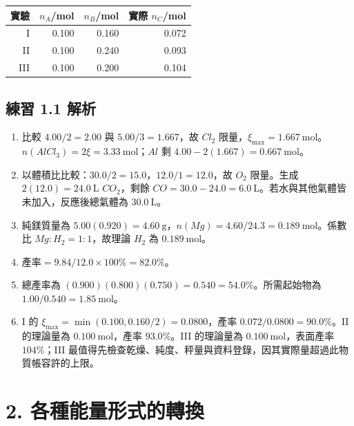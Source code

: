 \documentclass[11pt,a4paper]{article}
\newcounter{none}
\providecommand{\tightlist}{%
  \setlength{\itemsep}{0pt}\setlength{\parskip}{0pt}}
\begin{document}
{\def\LTcaptype{none} %
\begin{longtable}[]{@{}rrrr@{}}
\toprule\noalign{}
實驗 & \(n_A\)/mol & \(n_B\)/mol & 實際 \(n_C\)/mol \\
\midrule\noalign{}
\endhead
\bottomrule\noalign{}
\endlastfoot
I & 0.100 & 0.160 & 0.072 \\
II & 0.100 & 0.240 & 0.093 \\
III & 0.100 & 0.200 & 0.104 \\
\end{longtable}
}

\subsection{練習 1.1 解析}\label{ux7df4ux7fd2-1.1-ux89e3ux6790}

\begin{enumerate}
\def\labelenumi{\arabic{enumi}.}
\tightlist
\item
  比較 \(4.00/2=2.00\) 與 \(5.00/3=1.667\)，故 \(Cl_2\) 限量，\(\xi_{\max}=1.667\ \mathrm{mol}\)。\(n(AlCl_3)=2\xi=3.33\ \mathrm{mol}\)；\(Al\) 剩 \(4.00-2(1.667)=0.667\ \mathrm{mol}\)。
\item
  以體積比比較：\(30.0/2=15.0\)，\(12.0/1=12.0\)，故 \(O_2\) 限量。生成 \(2(12.0)=24.0\ \mathrm L\) \(CO_2\)，剩餘 \(CO=30.0-24.0=6.0\ \mathrm L\)。若水與其他氣體皆未加入，反應後總氣體為 \(30.0\ \mathrm L\)。
\item
  純鎂質量為 \(5.00(0.920)=4.60\ \mathrm g\)，\(n(Mg)=4.60/24.3=0.189\ \mathrm{mol}\)。係數比 \(Mg:H_2=1:1\)，故理論 \(H_2\) 為 \(0.189\ \mathrm{mol}\)。
\item
  \(\text{產率}=9.84/12.0\times100\%=82.0\%\)。
\item
  總產率為 \((0.900)(0.800)(0.750)=0.540=54.0\%\)。所需起始物為 \(1.00/0.540=1.85\ \mathrm{mol}\)。
\item
  I 的 \(\xi_{\max}=\min(0.100,0.160/2)=0.0800\)，產率 \(0.072/0.0800=90.0\%\)。II 的理論量為 \(0.100\ \mathrm{mol}\)，產率 \(93.0\%\)。III 的理論量為 \(0.100\ \mathrm{mol}\)，表面產率 \(104\%\)；III 最值得先檢查乾燥、純度、秤量與資料登錄，因其實際量超過此物質帳容許的上限。
\end{enumerate}

\section{2. 各種能量形式的轉換}\label{ux5404ux7a2eux80fdux91cfux5f62ux5f0fux7684ux8f49ux63db}
\end{document}
